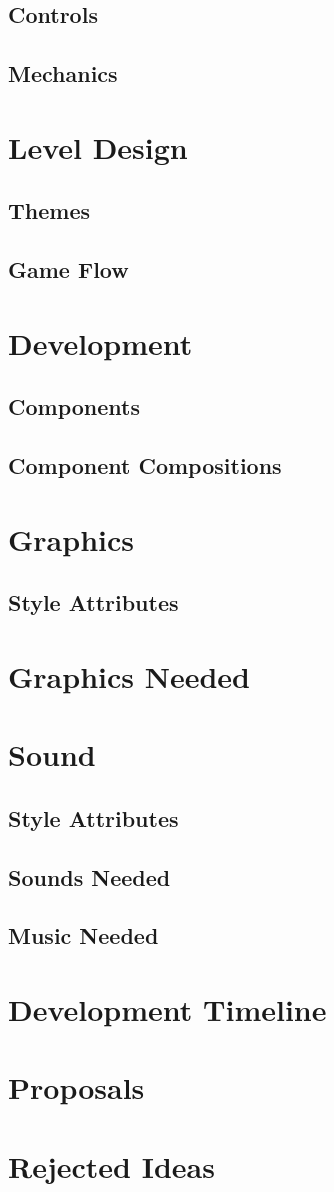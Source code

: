 \documentclass[letterpaper, twoside, 12pt]{memoir}
\begin{document}
\section{Controls}
\section{Mechanics}

\chapter{Level Design}
\section{Themes}
\section{Game Flow}

\chapter{Development}
\section{Components}
\section{Component Compositions}

\chapter{Graphics}
\section{Style Attributes}
\chapter{Graphics Needed}

\chapter{Sound}
\section{Style Attributes}
\section{Sounds Needed}
\section{Music Needed}

\chapter{Development Timeline}

\chapter{Proposals}

\chapter{Rejected Ideas}
\end{document}
